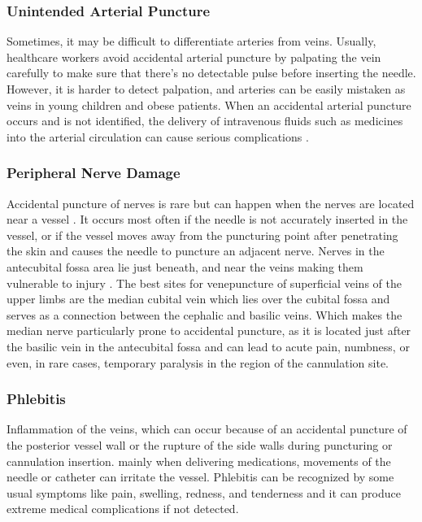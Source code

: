 
\subsubsection{Unintended Arterial Puncture}
Sometimes, it may be difficult to differentiate arteries from veins. Usually, healthcare workers avoid accidental arterial puncture by palpating the vein carefully to make sure that there's no detectable pulse before inserting the needle. 
However, it is harder to detect palpation, and arteries can be easily mistaken as veins in young children and obese patients. When an accidental arterial puncture occurs and is not identified, the delivery of intravenous fluids such as medicines into the arterial circulation can cause serious complications \parencite{comlicationsVeni3}.

\subsubsection{Peripheral Nerve Damage}
Accidental puncture of nerves is rare but can happen when the nerves are located near a vessel \parencite{comlicationsVeni4}. It occurs most often if the needle is not accurately inserted in the vessel, or if the vessel moves away from the puncturing point after penetrating the skin and causes the needle to puncture an adjacent nerve. Nerves in the antecubital fossa area lie just beneath, and near the veins making them vulnerable to injury \parencite{comlicationsVeni4}.
The best sites for venepuncture of superficial veins of the upper limbs are the median cubital vein which lies over the cubital fossa and serves as a connection between the cephalic and basilic veins. Which makes the median nerve particularly prone to accidental puncture, as it is located just after the basilic vein in the antecubital fossa and can lead to acute pain, numbness, or even, in rare cases, temporary paralysis in the region of the cannulation site.

\subsubsection{Phlebitis}
Inflammation of the veins, which can occur because of an accidental puncture of the posterior vessel wall or the rupture of the side walls during puncturing or cannulation insertion. mainly when delivering medications, movements of the needle or catheter can irritate the vessel. Phlebitis can be recognized by some usual symptoms like pain, swelling, redness, and tenderness and it can produce extreme medical complications if not detected. 



